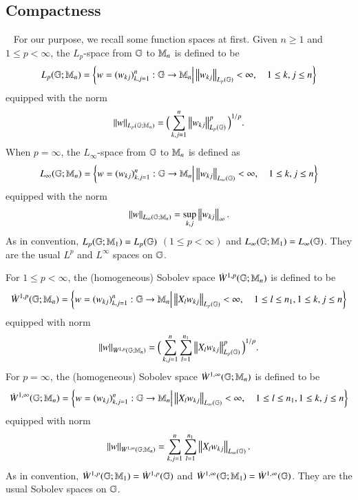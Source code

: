 \documentclass[leqno]{amsart}
\begin{document}
	
	
	
	\subsection{Compactness \expandafter{}}\label{Compactness section1}
	\ 
	\newline
	For our purpose, we recall some function spaces at first. 
	Given $n\geq1$ and $1\leq p<\infty$, the $L_{p}$-space from $\mathbb{G}$ to $\mathbb{M}_{n}$ is defined to be 
	\begin{align*} 
		L_{p}(\mathbb{G};\mathbb{M}_{n})=
		\left\{ w=(w_{kj})_{k,j=1}^{n}:\mathbb{G}\rightarrow\mathbb{M}_{n}\Big| \left\| w_{kj} \right\|_{L_{p}(\mathbb{G})}<\infty,\quad 1\leq k,j\leq n \right\}
	\end{align*}
	equipped with the norm
	\begin{align*}
		\left\| w \right\|_{L_{p}(\mathbb{G};\mathbb{M}_{n})}
		=\Big(\sum_{k,j=1}^{n}\left\| w_{kj} \right\|_{L_{p}(\mathbb{G})}^{p}\Big)^{1/p}.
	\end{align*}
	When $p=\infty$, the $L_{\infty}$-space from $\mathbb{G}$ to $\mathbb{M}_{n}$ is defined as
	\begin{align*} 
		L_{\infty}(\mathbb{G};\mathbb{M}_{n})=
		\left\{ w=(w_{kj})_{k,j=1}^{n}:\mathbb{G}\rightarrow\mathbb{M}_{n}\Big| \left\| w_{kj} \right\|_{L_{\infty}(\mathbb{G})}<\infty,\quad 1\leq k,j\leq n \right\}
	\end{align*}
	equipped with the norm
	\begin{align*}
		\left\| w \right\|_{L_{\infty}(\mathbb{G};\mathbb{M}_{n})}=\sup_{k,j}\left\| w_{kj} \right\|_{\infty}.
	\end{align*}
	As in convention, $L_{p}(\mathbb{G};\mathbb{M}_{1})=L_{p}(\mathbb{G})$ $(1\leq p<\infty)$ and $L_{\infty}(\mathbb{G};\mathbb{M}_{1})=L_{\infty}(\mathbb{G})$.
	They are the usual $L^{p}$ and $L^{\infty}$ spaces on $\mathbb{G}$.
	
	
	
	For $1\leq p<\infty$, the (homogeneous) Sobolev space $\dot{W}^{1,p}(\mathbb{G};\mathbb{M}_{n})$ is defined to be
	\begin{align*}
		\dot{W}^{1,p}(\mathbb{G};\mathbb{M}_{n})=
		\left\{ w=(w_{kj})_{k,j=1}^{n}:\mathbb{G}\rightarrow\mathbb{M}_{n}\Big| \left\| X_{l}w_{kj} \right\|_{L_{p}(\mathbb{G})}<\infty,\quad 1\leq l\leq n_{1}, 1\leq k,j\leq n \right\}
	\end{align*}
	equipped with norm
	\begin{align*}
		\left\| w \right\|_{\dot{W}^{1,p}(\mathbb{G};\mathbb{M}_{n})}
		=\Big(\sum_{k,j=1}^{n}\sum_{l=1}^{n_{1}}\left\| X_{l}w_{kj} \right\|_{L_{p}(\mathbb{G})}^{p}\Big)^{1/p}.
	\end{align*}
	For $p=\infty$, the (homogeneous) Sobolev space $\dot{W}^{1,\infty}(\mathbb{G};\mathbb{M}_{n})$ is defined to be
	\begin{align*}
		\dot{W}^{1,\infty}(\mathbb{G};\mathbb{M}_{n})=
		\left\{ w=(w_{kj})_{k,j=1}^{n}:\mathbb{G}\rightarrow\mathbb{M}_{n}\Big| \left\| X_{l}w_{kj} \right\|_{L_{\infty}(\mathbb{G})}<\infty,\quad 1\leq l\leq n_{1}, 1\leq k,j\leq n \right\}
	\end{align*}
	equipped with norm
	\begin{align*}
		\left\| w \right\|_{\dot{W}^{1,\infty}(\mathbb{G};\mathbb{M}_{n})}
		=\sum_{k,j=1}^{n}\sum_{l=1}^{n_{1}}\left\| X_{l}w_{kj} \right\|_{L_{\infty}(\mathbb{G})}.
	\end{align*}
	As in convention, $\dot{W}^{1,p}(\mathbb{G};\mathbb{M}_{1})=\dot{W}^{1,p}(\mathbb{G})$ and $\dot{W}^{1,\infty}(\mathbb{G};\mathbb{M}_{1})=\dot{W}^{1,\infty}(\mathbb{G})$. They are the usual Sobolev spaces on $\mathbb{G}$.
	
\end{document}
